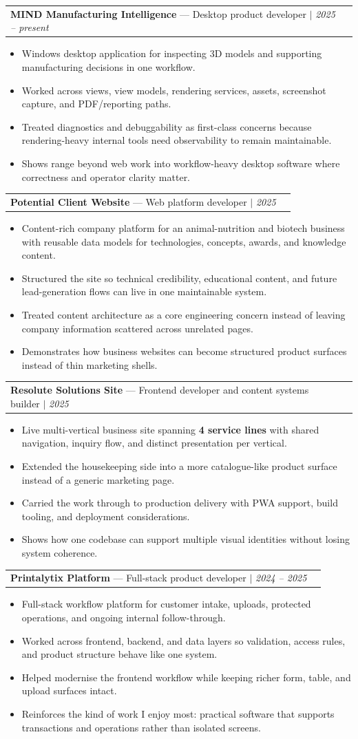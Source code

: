 \documentclass[letterpaper,11pt]{article}
\makeatletter
\newcommand{\resumeItem}[1]{\item\small{{#1 \vspace{-1pt}}}}
\newcommand{\resumeProjectHeading}[2]{
    \item
    \begin{tabular*}{1.001\textwidth}{l@{\extracolsep{\fill}}r}
      \small#1 & \textbf{\small #2}\\
    \end{tabular*}\vspace{-6pt}
}
\newcommand{\resumeItemListStart}{\begin{itemize}[leftmargin=0.15in]}
\newcommand{\resumeItemListEnd}{\end{itemize}\vspace{-4pt}}
\makeatother
\begin{document}
  \resumeProjectHeading
    {\textbf{MIND Manufacturing Intelligence} --- Desktop product developer $|$ \emph{2025 -- present}}{}
    \resumeItemListStart
      \resumeItem{Windows desktop application for inspecting 3D models and supporting manufacturing decisions in one workflow.}
      \resumeItem{Worked across views, view models, rendering services, assets, screenshot capture, and PDF/reporting paths.}
      \resumeItem{Treated diagnostics and debuggability as first-class concerns because rendering-heavy internal tools need observability to remain maintainable.}
      \resumeItem{Shows range beyond web work into workflow-heavy desktop software where correctness and operator clarity matter.}
    \resumeItemListEnd
    \vspace{-8pt}

  \resumeProjectHeading
    {\textbf{Potential Client Website} --- Web platform developer $|$ \emph{2025}}{}
    \resumeItemListStart
      \resumeItem{Content-rich company platform for an animal-nutrition and biotech business with reusable data models for technologies, concepts, awards, and knowledge content.}
      \resumeItem{Structured the site so technical credibility, educational content, and future lead-generation flows can live in one maintainable system.}
      \resumeItem{Treated content architecture as a core engineering concern instead of leaving company information scattered across unrelated pages.}
      \resumeItem{Demonstrates how business websites can become structured product surfaces instead of thin marketing shells.}
    \resumeItemListEnd
    \vspace{-8pt}

  \resumeProjectHeading
    {\textbf{Resolute Solutions Site} --- Frontend developer and content systems builder $|$ \emph{2025}}{}
    \resumeItemListStart
      \resumeItem{Live multi-vertical business site spanning \textbf{4 service lines} with shared navigation, inquiry flow, and distinct presentation per vertical.}
      \resumeItem{Extended the housekeeping side into a more catalogue-like product surface instead of a generic marketing page.}
      \resumeItem{Carried the work through to production delivery with PWA support, build tooling, and deployment considerations.}
      \resumeItem{Shows how one codebase can support multiple visual identities without losing system coherence.}
    \resumeItemListEnd
    \vspace{-8pt}

  \resumeProjectHeading
    {\textbf{Printalytix Platform} --- Full-stack product developer $|$ \emph{2024 -- 2025}}{}
    \resumeItemListStart
      \resumeItem{Full-stack workflow platform for customer intake, uploads, protected operations, and ongoing internal follow-through.}
      \resumeItem{Worked across frontend, backend, and data layers so validation, access rules, and product structure behave like one system.}
      \resumeItem{Helped modernise the frontend workflow while keeping richer form, table, and upload surfaces intact.}
      \resumeItem{Reinforces the kind of work I enjoy most: practical software that supports transactions and operations rather than isolated screens.}
    \resumeItemListEnd
    \vspace{-8pt}
\end{document}
